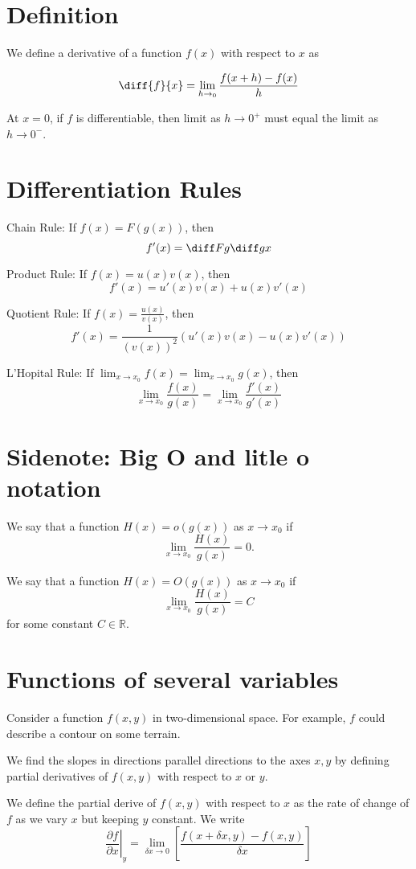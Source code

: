 \documentclass[12pt]{article}
\begin{document}
\section{Definition}

We define a derivative of a function $f(x)$ with respect to $x$ as

\[\diff{f}{x} = \lim_{h\to_{0}} \frac{f(x + h) - f(x)}{h}\]

At $x = 0$, if $f$ is differentiable, then limit as $h \to 0^{+}$ must 
equal the limit as $h \to 0^{-}$.

\section{Differentiation Rules}

\noindent Chain Rule: If $f(x) = F(g(x))$, then
\[f'(x) = \diff Fg \diff gx\]

\noindent Product Rule: If $f(x) = u(x)v(x)$, then
\[f'(x) = u'(x)v(x) + u(x)v'(x)\]

\noindent Quotient Rule: 
If $f(x) = \frac{u(x)}{v(x)}$, then
\[f'(x) = \frac{1}{(v(x))^{2}}(u'(x)v(x) - u(x)v'(x))\]

\noindent L'Hopital Rule: If $\lim_{x \to x_{0}} f(x) = \lim_{x \to x_{0}} g(x)$, then
\[\lim_{x\to x_{0}} \frac{f(x)}{g(x)} = \lim_{x\to x_{0}} \frac{f'(x)}{g'(x)}\]

\section{Sidenote: Big O and litle o notation}

We say that a function $H(x) = o(g(x))$ as $x \to x_{0}$ if
\[\lim_{x\to x_{0}} \frac{H(x)}{g(x)} = 0.\]

\noindent We say that a function $H(x) = O(g(x))$ as $x \to x_{0}$ if
\[\lim_{x\to x_{0}} \frac{H(x)}{g(x)} = C\]
for some constant $C \in \mathbb{R}$.

\section{Functions of several variables}

Consider a function $f(x,y)$ in two-dimensional space.
For example, $f$ could describe a contour on some terrain.

We find the slopes in directions parallel directions to the axes $x,y$
by defining partial derivatives of $f(x,y)$ with respect to $x$ or $y$.

We define the partial derive of $f(x,y)$ with respect to $x$ as
the rate of change of $f$ as we vary $x$ but keeping $y$ constant. We write
\[
    \left.\frac{\partial f}{\partial x}\right|_y 
        = \lim_{\delta x \to 0}\left[\frac{f(x + \delta x, y) - f(x,y)}{\delta x}\right]
\]
\end{document}
